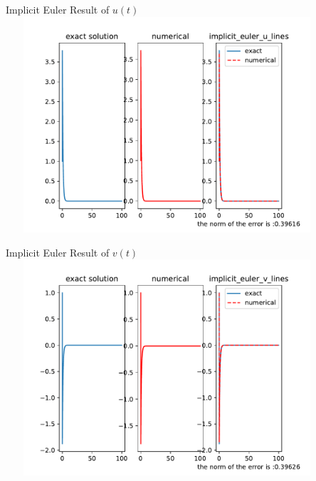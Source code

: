 \documentclass{beamer}
\begin{document}
 \begin{frame}{Implicit Euler Result of $u(t)$}
    \centering
    \includegraphics[height=8cm,width=12cm]{implicit_euler_u_lines.pdf}
 \end{frame}
 \begin{frame}{Implicit Euler Result of $v(t)$}
    \centering
    \includegraphics[height=8cm,width=12cm]{implicit_euler_v_lines.pdf}
 \end{frame}
\end{document}

